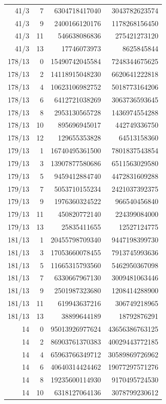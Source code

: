 \begin{longtable}{@{}rrrr@{}}
41/3 & 7 & 6304718417040 & 3043782623574\\
41/3 & 9 & 2400166120176 & 1178268156450\\
41/3 & 11 & 546638086836 & 275421273120\\
41/3 & 13 & 17746073973 & 8625845844\\
178/13 & 0 & 15490742045584 & 7248344675625\\
178/13 & 2 & 14118915048230 & 6620641222818\\
178/13 & 4 & 10623106982752 & 5018773164206\\
178/13 & 6 & 6412721038269 & 3063736593645\\
178/13 & 8 & 2953130565728 & 1436974554288\\
178/13 & 10 & 895696945017 & 442749336750\\
178/13 & 12 & 129655353828 & 64513158360\\
179/13 & 1 & 16740495361500 & 7801837543854\\
179/13 & 3 & 13907877580686 & 6511563029580\\
179/13 & 5 & 9459412884740 & 4472831609288\\
179/13 & 7 & 5053710155234 & 2421037392375\\
179/13 & 9 & 1976360324522 & 966540456840\\
179/13 & 11 & 450820772140 & 224399084000\\
179/13 & 13 & 25835411655 & 12527124775\\
181/13 & 1 & 20455798709340 & 9447198399730\\
181/13 & 3 & 17053660078455 & 7913745993636\\
181/13 & 5 & 11665315793560 & 5462950367098\\
181/13 & 7 & 6330667967130 & 3009481063446\\
181/13 & 9 & 2501987323680 & 1208414288900\\
181/13 & 11 & 619943637216 & 306749218965\\
181/13 & 13 & 38899644189 & 18792876291\\
14 & 0 & 95013926977624 & 43656386763125\\
14 & 2 & 86903761370383 & 40029443772185\\
14 & 4 & 65963766349712 & 30589869726962\\
14 & 6 & 40640314424462 & 19077297571276\\
14 & 8 & 19235600114930 & 9170495724530\\
14 & 10 & 6318127064136 & 3078799230612\\

\end{longtable}
